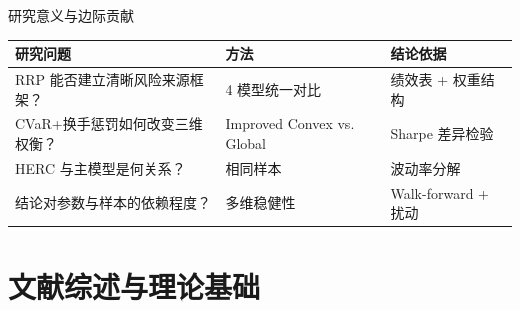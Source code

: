 \documentclass[aspectratio=169,11pt]{beamer}
\begin{document}
\begin{frame}{研究意义与边际贡献}
  \begin{swufekeypoints}
  \end{swufekeypoints}
  \vspace{0.8em}
  \begin{center}
    \small
    \begin{tabular}{lll}
      \toprule
      研究问题 & 方法 & 结论依据 \\
      \midrule
      RRP 能否建立清晰风险来源框架？ & 4 模型统一对比 & 绩效表 + 权重结构 \\
      CVaR+换手惩罚如何改变三维权衡？ & Improved Convex vs. Global & Sharpe 差异检验 \\
      HERC 与主模型是何关系？ & 相同样本 & 波动率分解 \\
      结论对参数与样本的依赖程度？ & 多维稳健性 & Walk-forward + 扰动 \\
      \bottomrule
    \end{tabular}
  \end{center}
\end{frame}

\section{文献综述与理论基础}
\end{document}
